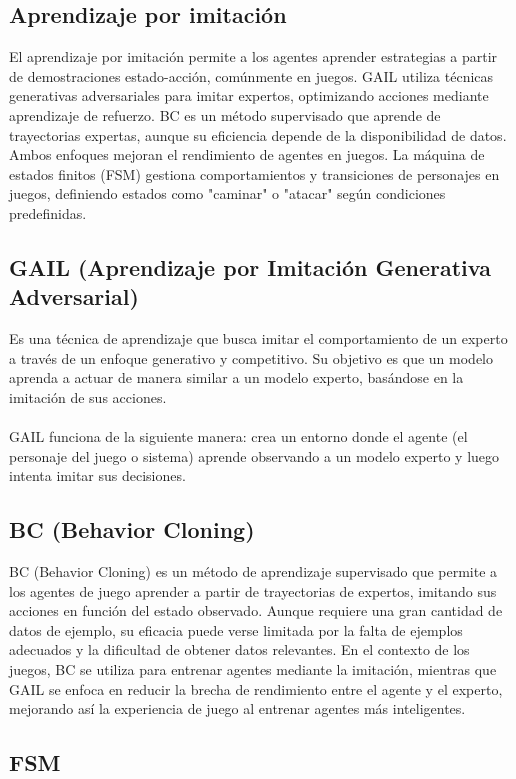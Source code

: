 \documentclass{article}
\begin{document}
\subsection{Aprendizaje por imitación}
El aprendizaje por imitación permite a los agentes aprender estrategias a partir de demostraciones estado-acción, comúnmente en juegos. GAIL utiliza técnicas generativas adversariales para imitar expertos, optimizando acciones mediante aprendizaje de refuerzo. BC es un método supervisado que aprende de trayectorias expertas, aunque su eficiencia depende de la disponibilidad de datos. Ambos enfoques mejoran el rendimiento de agentes en juegos. La máquina de estados finitos (FSM) gestiona comportamientos y transiciones de personajes en juegos, definiendo estados como "caminar" o "atacar" según condiciones predefinidas.

\subsection{GAIL (Aprendizaje por Imitación Generativa Adversarial)}
Es una técnica de aprendizaje que busca imitar el comportamiento de un experto a través de un enfoque generativo y competitivo. Su objetivo es que un modelo aprenda a actuar de manera similar a un modelo experto, basándose en la imitación de sus acciones.
\\
\\
GAIL funciona de la siguiente manera: crea un entorno donde el agente (el personaje del juego o sistema) aprende observando a un modelo experto y luego intenta imitar sus decisiones. 

\subsection{BC (Behavior Cloning)}
BC (Behavior Cloning) es un método de aprendizaje supervisado que permite a los agentes de juego aprender a partir de trayectorias de expertos, imitando sus acciones en función del estado observado. Aunque requiere una gran cantidad de datos de ejemplo, su eficacia puede verse limitada por la falta de ejemplos adecuados y la dificultad de obtener datos relevantes. En el contexto de los juegos, BC se utiliza para entrenar agentes mediante la imitación, mientras que GAIL se enfoca en reducir la brecha de rendimiento entre el agente y el experto, mejorando así la experiencia de juego al entrenar agentes más inteligentes.

\subsection{FSM}
\end{document}
